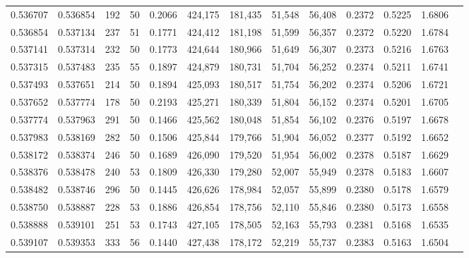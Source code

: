 \begin{tabular}{rrrrrrrrrrrrr}
0.536707 & 0.536854 &   192 &  50 &                                     0.2066 & 424,175 & 181,435 &  51,548 &  56,408 & 0.2372 & 0.5225 & 1.6806 \\
0.536854 & 0.537134 &   237 &  51 &                                     0.1771 & 424,412 & 181,198 &  51,599 &  56,357 & 0.2372 & 0.5220 & 1.6784 \\
0.537141 & 0.537314 &   232 &  50 &                                     0.1773 & 424,644 & 180,966 &  51,649 &  56,307 & 0.2373 & 0.5216 & 1.6763 \\
0.537315 & 0.537483 &   235 &  55 &                                     0.1897 & 424,879 & 180,731 &  51,704 &  56,252 & 0.2374 & 0.5211 & 1.6741 \\
0.537493 & 0.537651 &   214 &  50 &                                     0.1894 & 425,093 & 180,517 &  51,754 &  56,202 & 0.2374 & 0.5206 & 1.6721 \\
0.537652 & 0.537774 &   178 &  50 &                                     0.2193 & 425,271 & 180,339 &  51,804 &  56,152 & 0.2374 & 0.5201 & 1.6705 \\
0.537774 & 0.537963 &   291 &  50 &                                     0.1466 & 425,562 & 180,048 &  51,854 &  56,102 & 0.2376 & 0.5197 & 1.6678 \\
0.537983 & 0.538169 &   282 &  50 &                                     0.1506 & 425,844 & 179,766 &  51,904 &  56,052 & 0.2377 & 0.5192 & 1.6652 \\
0.538172 & 0.538374 &   246 &  50 &                                     0.1689 & 426,090 & 179,520 &  51,954 &  56,002 & 0.2378 & 0.5187 & 1.6629 \\
0.538376 & 0.538478 &   240 &  53 &                                     0.1809 & 426,330 & 179,280 &  52,007 &  55,949 & 0.2378 & 0.5183 & 1.6607 \\
0.538482 & 0.538746 &   296 &  50 &                                     0.1445 & 426,626 & 178,984 &  52,057 &  55,899 & 0.2380 & 0.5178 & 1.6579 \\
0.538750 & 0.538887 &   228 &  53 &                                     0.1886 & 426,854 & 178,756 &  52,110 &  55,846 & 0.2380 & 0.5173 & 1.6558 \\
0.538888 & 0.539101 &   251 &  53 &                                     0.1743 & 427,105 & 178,505 &  52,163 &  55,793 & 0.2381 & 0.5168 & 1.6535 \\
0.539107 & 0.539353 &   333 &  56 &                                     0.1440 & 427,438 & 178,172 &  52,219 &  55,737 & 0.2383 & 0.5163 & 1.6504 \\

\end{tabular}
